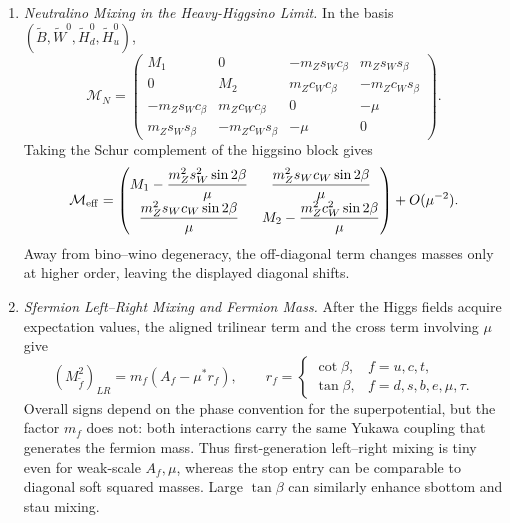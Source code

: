 \begin{enumerate}
  \begin{enumerate}
    \item \emph{Neutralino Mixing in the Heavy-Higgsino Limit.}
    In the basis
      \((\widetilde B,\widetilde W^0,\widetilde H_d^0,\widetilde H_u^0)\),
      \[
        \mathcal M_N=
        \begin{pmatrix}
          M_1&0&-m_Zs_Wc_\beta&m_Zs_Ws_\beta\\
          0&M_2&m_Zc_Wc_\beta&-m_Zc_Ws_\beta\\
          -m_Zs_Wc_\beta&m_Zc_Wc_\beta&0&-\mu\\
          m_Zs_Ws_\beta&-m_Zc_Ws_\beta&-\mu&0
        \end{pmatrix}.
      \]
      Taking the Schur complement of the higgsino block gives
      \[
        \mathcal M_{\rm eff}=
        \begin{pmatrix}
          M_1-\dfrac{m_Z^2s_W^2\sin2\beta}{\mu}
          &\dfrac{m_Z^2s_Wc_W\sin2\beta}{\mu}\\[5pt]
          \dfrac{m_Z^2s_Wc_W\sin2\beta}{\mu}
          &M_2-\dfrac{m_Z^2c_W^2\sin2\beta}{\mu}
        \end{pmatrix}
        +O(\mu^{-2}).
      \]
      Away from bino--wino degeneracy, the off-diagonal term changes masses
      only at higher order, leaving the displayed diagonal shifts.
    \item \emph{Sfermion Left--Right Mixing and Fermion Mass.}
    After the Higgs fields acquire expectation values, the aligned
      trilinear term and the cross term involving \(\mu\) give
      \[
        (M_{\widetilde f}^2)_{LR}
          =m_f\left(A_f-\mu^*r_f\right),
        \qquad
        r_f=
        \begin{cases}
          \cot\beta,&f=u,c,t,\\
          \tan\beta,&f=d,s,b,e,\mu,\tau.
        \end{cases}
      \]
      Overall signs depend on the phase convention for the superpotential,
      but the factor \(m_f\) does not: both interactions carry the same
      Yukawa coupling that generates the fermion mass.  Thus first-generation
      left--right mixing is tiny even for weak-scale \(A_f,\mu\), whereas the
      stop entry can be comparable to diagonal soft squared masses.  Large
      \(\tan\beta\) can similarly enhance sbottom and stau mixing.
  \end{enumerate}


\end{enumerate}
